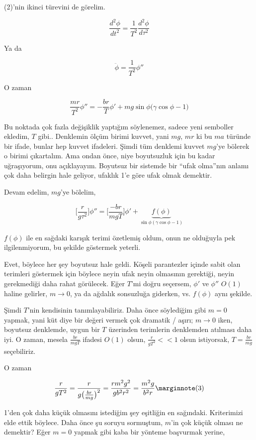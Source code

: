 \documentclass[12pt,fleqn]{article}\usepackage{../../common}
\begin{document}
(2)'nin ikinci türevini de görelim.

$$ \frac{d^2\phi}{dt^2} = \frac{1}{T^2} \frac{d^2\phi}{d\tau^2} $$

Ya da

$$ \ddot{\phi} = \frac{1}{T^2} \phi'' $$

O zaman

$$
\frac{mr}{T^2} \phi'' = -\frac{br}{T} \phi' +
mg\sin\phi \bigg(\gamma \cos\phi - 1 \bigg)
$$

Bu noktada çok fazla değişiklik yaptığım söylenemez, sadece yeni semboller
ekledim, $T$ gibi.. Denklemin ölçüm birimi kuvvet, yani $mg$, $mr$ ki bu $ma$
türünde bir ifade, bunlar hep kuvvet ifadeleri. Şimdi tüm denklemi kuvvet
$mg$'ye bölerek o birimi çıkartalım. Ama ondan önce, niye boyutsuzluk için bu
kadar uğraşıyorum, onu açıklayayım. Boyutsuz bir sistemde bir ``ufak olma''nın
anlamı çok daha belirgin hale geliyor, ufaklık 1'e göre ufak olmak
demektir.

Devam edelim, $mg$'ye bölelim,

$$ \bigg[ \frac{r}{g\tau^2} \bigg] \phi'' = \bigg[ \frac{-br}{mgT} \bigg]\phi' +
\underbrace{f(\phi) }_{\sin\phi (\gamma \cos\phi -1 )} $$

$f(\phi)$ ile en sağdaki karışık terimi özetlemiş oldum, onun ne olduğuyla pek
ilgilenmiyorum, bu şekilde göstermek yeterli. 

Evet, böylece her şey boyutsuz hale geldi. Köşeli parantezler içinde sabit olan
terimleri göstermek için böylece neyin ufak neyin olmasının gerektiği, neyin
gerekmediği daha rahat görülecek. Eğer $T$'mi doğru seçersem, $\phi'$ ve
$\phi''$ $O(1)$ haline gelirler, $m \to 0$, ya da ağdalık sonsuzluğa giderken,
vs. $f(\phi)$ aynı şekilde. 

Şimdi $T$'nin kendisinin tanımlayabiliriz. Daha önce söylediğim gibi $m=0$
yapmak, yani küt diye bir değeri vermek çok dramatik / aşırı; $m \to 0$ iken,
boyutsuz denklemde, uygun bir $T$ üzerinden terimlerin denklemden atılması daha
iyi. O zaman, mesela $\frac{br}{mgT}$ ifadesi $O(1)$ olsun, $\frac{r}{gT^2} <<
1$ olsun istiyorsak, $T = \frac{br}{mg}$ seçebiliriz.

O zaman

$$ \frac{r}{gT^2} = \frac{r}{ g \big( \frac{br}{mg} \big)^2 }  =
\frac{r m^2 g^2}{gb^2r^2} = \frac{m^2g}{b^2r}
\mlabel{3}
$$

1'den çok daha küçük olmasını istediğim şey eşitliğin en sağındaki. Kriterimizi
elde ettik böylece. Daha önce şu soruyu sormuştum, $m$'in çok küçük olması ne
demektir? Eğer $m=0$ yapmak gibi kaba bir yönteme başvurmak yerine,
\end{document}
